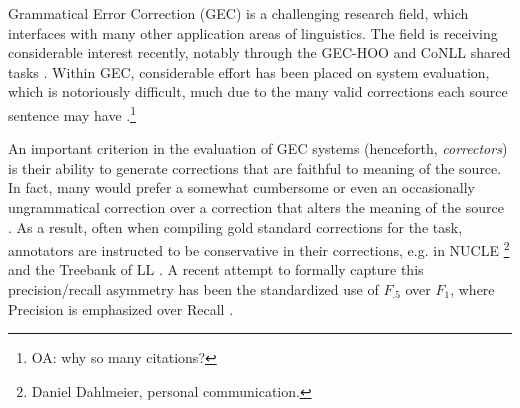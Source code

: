 \documentclass[letter,11pt]{article}
\newcommand{\oa}[1]{\footnote{\color{red}OA: #1}}
\begin{document}



Grammatical Error Correction (GEC) is a challenging research field, which interfaces with many
other application areas of linguistics. The field is receiving considerable
interest recently, notably through the GEC-HOO \cite{dale2011helping,dale2012hoo} and
CoNLL shared tasks \cite{kao2013conll,ng2014conll}.
Within GEC, considerable effort has been placed on system evaluation,
which is notoriously difficult,
much due to the many valid corrections each source sentence may have
\cite{tetreault2008native,madnani2011they,chodorow2012problems,dahlmeier2012better}.\oa{why so many citations?}

An important criterion in the evaluation of GEC systems (henceforth, {\it correctors})
is their ability to generate corrections that are faithful to meaning of the source. In fact, many would prefer
a somewhat cumbersome or even an occasionally ungrammatical correction over a correction
that alters the meaning of the source \cite{brockett2006correcting}.
As a result, often when compiling gold standard corrections for the task,
annotators are instructed to be conservative in their corrections, e.g. in NUCLE \footnote{Daniel Dahlmeier, personal communication.} and the Treebank of LL \cite{nicholls2003cambridge}.
A recent attempt to formally capture this precision/recall asymmetry has
been the standardized use of $F_{.5}$ over $F_{1}$, where Precision is
emphasized over Recall \cite{dahlmeier2012better}.
\end{document}

